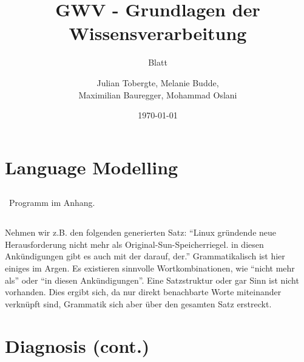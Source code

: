 \documentclass[DIV=9,numbers=noenddot]{scrartcl}
\title{GWV - Grundlagen der Wissensverarbeitung}
\subtitle{Blatt \arabic{blatt}}
\author{Julian Tobergte, Melanie Budde,\\Maximilian Bauregger, Mohammad Oslani}
\date{\today}
\begin{document}
	\maketitle
	\section{Language Modelling}
		\subsection{}\
			Programm im Anhang.
		\subsection{}
			Nehmen wir z.B. den folgenden generierten Satz: "`Linux gründende neue Herausforderung nicht mehr als Original-Sun-Speicherriegel. in diesen Ankündigungen gibt es auch mit der darauf, der."' Grammatikalisch ist hier einiges im Argen. Es existieren sinnvolle Wortkombinationen, wie "`nicht mehr als"' oder "`in diesen Ankündigungen"'. Eine Satzstruktur oder gar Sinn ist nicht vorhanden. Dies ergibt sich, da nur direkt benachbarte Worte miteinander verknüpft sind, Grammatik sich aber über den gesamten Satz erstreckt.
	\section{Diagnosis (cont.)}
\end{document}
